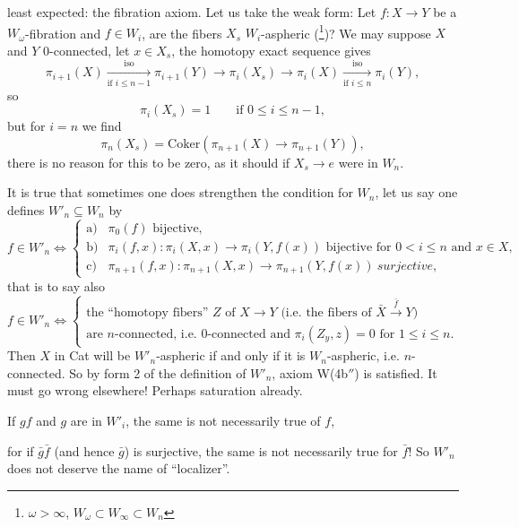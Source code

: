 least expected: the fibration axiom. Let us take the weak form: Let $f : X \longrightarrow Y$ be a $W_\omega$-fibration and $f \in W_i$, are the fibers $X_s$ $W_i$-aspheric (\footnote[37]{$\omega > \infty$, $W_\omega \subset W_\infty \subset W_n$})? We may suppose $X$ and $Y$ 0-connected, let $x \in X_s$, the homotopy exact sequence gives
\[
\pi_{i+1}(X) \xrightarrow[\text{if } i \leq n-1]{\text{iso}} \pi_{i+1}(Y) \longrightarrow \pi_i(X_s) \longrightarrow \pi_i(X) \xrightarrow[\text{if } i \leq n]{\text{iso}} \pi_i(Y),
\]
so
\[
\pi_i(X_s) = 1 \qquad \text{if } 0 \leq i \leq n-1,
\]
but for $i = n$ we find
\[
\pi_n(X_s) = \mathrm{Coker}\left(\pi_{n+1}(X) \longrightarrow \pi_{n+1}(Y)\right),
\]
there is no reason for this to be zero, as it should if $X_s \longrightarrow e$ were in $W_n$.

It is true that sometimes one does strengthen the condition for $W_n$, let us say one defines $W'_n \subseteq W_n$ by
\[
f \in W'_n \iff \left\{
\begin{array}{ll}
\text{a)} & \pi_0(f) \text{ bijective,} \\[1ex]
\text{b)} & \pi_i(f,x) : \pi_i(X,x) \longrightarrow \pi_i(Y,f(x)) \text{ bijective for } 0 < i \leq n \text{ and } x \in X, \\[1ex]
\text{c)} & \pi_{n+1}(f,x) : \pi_{n+1}(X,x) \longrightarrow \pi_{n+1}(Y,f(x)) \ \textit{surjective,}
\end{array}
\right.
\]
that is to say also
\[
f \in W'_n \iff \left\{
\begin{array}{l}
\text{the ``homotopy fibers'' } Z \text{ of } X \longrightarrow Y \text{ (i.e. the fibers of } \bar{X} \xrightarrow{\bar{f}} Y\text{)} \\
\text{are } n\text{-connected, i.e. 0-connected and } \pi_i(Z_y,z) = 0 \text{ for } 1 \leq i \leq n.
\end{array}
\right.
\]
Then $X$ in Cat will be $W'_n$-aspheric if and only if it is $W_n$-aspheric, i.e. $n$-connected. So by form 2 of the definition of $W'_n$, axiom W(4b$''$) is satisfied. It must go wrong elsewhere! Perhaps saturation already.

\hspace*{3em}If $gf$ and $g$ are in $W'_i$, the same is not necessarily true of $f$,

for if $\bar{g}\bar{f}$ (and hence $\bar{g}$) is surjective, the same is not necessarily true for $\bar{f}$! So $W'_n$ does not deserve the name of ``localizer''. %

